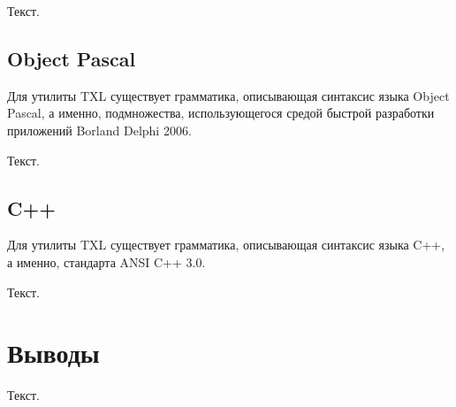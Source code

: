 Текст.

\subsection{Object Pascal}

Для утилиты TXL существует грамматика, описывающая синтаксис языка Object Pascal, а именно, подмножества, использующегося средой быстрой разработки приложений Borland Delphi 2006.

Текст.

\subsection{C++}

Для утилиты TXL существует грамматика, описывающая синтаксис языка C++, а именно, стандарта ANSI C++ 3.0.

Текст.

\section{Выводы}

Текст.
